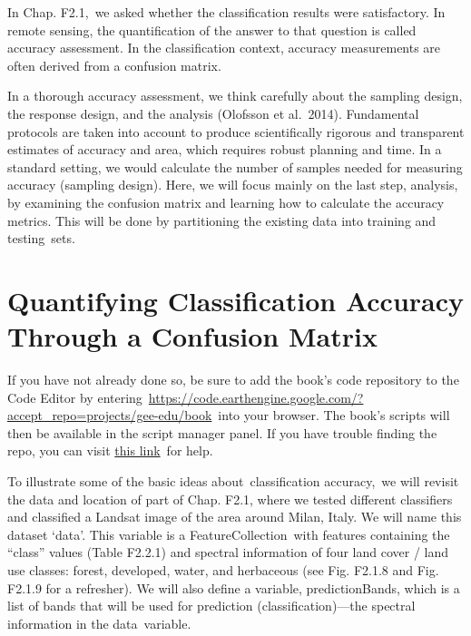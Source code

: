 \documentclass[
  letterpaper,
  DIV=11,
  numbers=noendperiod]{scrreprt}
\begin{document}
In Chap. F2.1,~we asked whether the classification results were
satisfactory. In remote sensing, the quantification of the answer to
that question is called accuracy assessment. In the classification
context, accuracy measurements are often derived from a confusion
matrix.

In a thorough accuracy assessment, we think carefully about the sampling
design, the response design, and the analysis (Olofsson et al.~2014).
Fundamental protocols are taken into account to produce scientifically
rigorous and transparent estimates of accuracy and area, which requires
robust planning and time. In a standard setting, we would calculate the
number of samples needed for measuring accuracy (sampling design). Here,
we will focus mainly on the last step, analysis, by examining the
confusion matrix and learning how to calculate the accuracy metrics.
This will be done by partitioning the existing data into training and
testing~sets.

\hypertarget{quantifying-classification-accuracy-through-a-confusion-matrix}{%
\section{Quantifying Classification Accuracy Through a Confusion
Matrix}\label{quantifying-classification-accuracy-through-a-confusion-matrix}}

If you have not already done so, be sure to add the book's code
repository to the Code Editor by
entering~\href{https://www.google.com/url?q=https://code.earthengine.google.com/?accept_repo\%3Dprojects/gee-edu/book\&sa=D\&source=editors\&ust=1671458829937499\&usg=AOvVaw3qqOwSX_A-Pllh6X3X31q4}{}\href{https://www.google.com/url?q=https://code.earthengine.google.com/?accept_repo\%3Dprojects/gee-edu/book\&sa=D\&source=editors\&ust=1671458829937976\&usg=AOvVaw0WioXIhzue8-WoaX4UtabH}{https://code.earthengine.google.com/?accept\_repo=projects/gee-edu/book}~into
your browser. The book's scripts will then be available in the script
manager panel. If you have trouble finding the repo, you can visit
\href{https://www.google.com/url?q=https://docs.google.com/presentation/d/1Kt6wGNoesYm__Cu3k3bnlbbyPN6m9SF4hQHK-pIDHfc/edit\%23slide\%3Did.g18a7b4b055d_0_624\&sa=D\&source=editors\&ust=1671458829938470\&usg=AOvVaw2CH8V3-_qV99EcgMxUAaSO}{this
link}~for help.

To illustrate some of the basic ideas about~classification accuracy,~we
will revisit the data and location of part of Chap. F2.1, where we
tested different classifiers and classified a Landsat image of the area
around Milan, Italy. We will name this dataset `data'. This variable is
a FeatureCollection~with features containing the ``class'' values (Table
F2.2.1) and spectral information of four land cover / land use classes:
forest, developed, water, and herbaceous (see Fig. F2.1.8 and Fig.
F2.1.9 for a refresher). We will also define a variable,
predictionBands, which is a list of bands that will be used for
prediction (classification)---the spectral information in the
data~variable.
\end{document}
